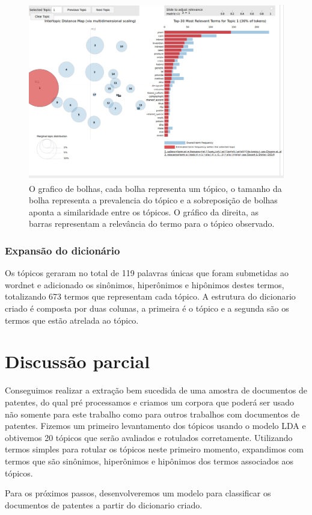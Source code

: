 \begin{figure}[ht!]
	\centering
	\includegraphics[scale=0.4]{imagens/construcao_dicionario1.png}
	\caption{O grafico de bolhas, cada bolha representa um tópico, o tamanho da bolha representa a prevalencia do tópico e a sobreposição de bolhas aponta a similaridade entre os tópicos. O gráfico da direita, as barras representam a relevância do termo para o tópico observado.
			 \label{pyLDAvis_image}}
\end{figure}

\subsubsection{Expansão do dicionário}

Os tópicos geraram no total de 119 palavras únicas que foram submetidas ao wordnet e adicionado os sinônimos, hiperônimos e hipônimos destes termos, totalizando 673 termos que representam cada tópico. A estrutura do dicionario criado é composta por duas colunas, a primeira é o tópico e a segunda são os termos que estão atrelada ao tópico.

\section{Discussão parcial}

Conseguimos realizar a extração bem sucedida de uma amostra de documentos de patentes, do qual pré processamos e criamos um corpora que poderá ser usado não somente para este trabalho como para outros trabalhos com documentos de patentes. Fizemos um primeiro levantamento dos tópicos usando o modelo LDA e obtivemos 20 tópicos que serão avaliados e rotulados corretamente. 
Utilizando termos simples para rotular os tópicos neste primeiro momento, expandimos com termos que são sinônimos, hiperônimos e hipônimos dos termos associados aos tópicos. 

Para os próximos passos, desenvolveremos um modelo para classificar os documentos de patentes a partir do dicionario criado. 

